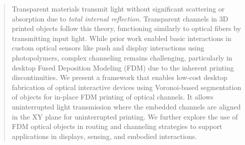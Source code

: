 \begin{abstract}





Transparent materials transmit light without significant scattering or absorption due to \textit{total internal reflection}. 
Transparent channels in 3D printed objects follow this theory, functioning similarly to optical fibers by transmitting input light. 
While prior work enabled basic interactions in custom optical sensors like push and display interactions using photopolymers, complex channeling 
remains challenging, particularly in desktop Fused Deposition Modeling (FDM) due to the inherent printing discontinuities. 
We present a framework that enables low-cost desktop fabrication of optical interactive devices using Voronoi-based segmentation of objects for in-place FDM printing of optical channels. It allows uninterrupted light transmission where the embedded channels are aligned in the XY plane for uninterrupted printing.
We further explore the use of FDM optical objects in routing and channeling strategies to support applications in displays, sensing, and embodied interactions.


\end{abstract}